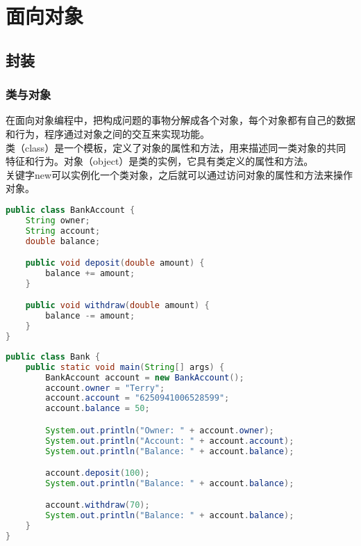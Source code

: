 \chapter{面向对象}

\section{封装}

\subsection{类与对象}

在面向对象编程中，把构成问题的事物分解成各个对象，每个对象都有自己的数据和行为，程序通过对象之间的交互来实现功能。\\

类（class）是一个模板，定义了对象的属性和方法，用来描述同一类对象的共同特征和行为。对象（object）是类的实例，它具有类定义的属性和方法。\\

关键字new可以实例化一个类对象，之后就可以通过访问对象的属性和方法来操作对象。\\


\begin{lstlisting}[language=Java]
public class BankAccount {
    String owner;
    String account;
    double balance;

    public void deposit(double amount) {
        balance += amount;
    }

    public void withdraw(double amount) {
        balance -= amount;
    }
}
\end{lstlisting}

\begin{lstlisting}[language=Java]
public class Bank {
    public static void main(String[] args) {
        BankAccount account = new BankAccount();
        account.owner = "Terry";
        account.account = "6250941006528599";
        account.balance = 50;

        System.out.println("Owner: " + account.owner);
        System.out.println("Account: " + account.account);
        System.out.println("Balance: " + account.balance);

        account.deposit(100);
        System.out.println("Balance: " + account.balance);

        account.withdraw(70);
        System.out.println("Balance: " + account.balance);
    }
}
\end{lstlisting}


